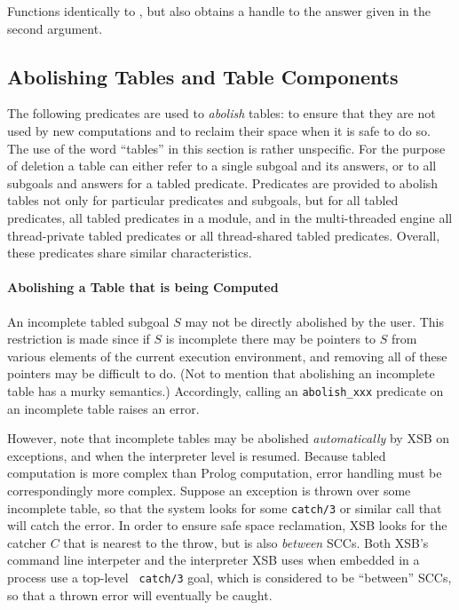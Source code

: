 \begin{description}
\begin{description}

%
Functions identically to , but also obtains a
handle to the answer given in the second argument.

\end{description}



\subsection{Abolishing Tables and Table Components}
\label{sec:TablePred:Deleting}

The following predicates are used to {\em abolish} tables: to ensure
that they are not used by new computations and to reclaim their space
when it is safe to do so.  The use of the word ``tables'' in this
section is rather unspecific.  For the purpose of deletion a table can
either refer to a single subgoal and its answers, or to all subgoals
and answers for a tabled predicate.  Predicates are provided to
abolish tables not only for particular predicates and subgoals, but
for all tabled predicates, all tabled predicates in a module, and in
the multi-threaded engine all thread-private tabled predicates or all
thread-shared tabled predicates.  Overall, these predicates share
similar characteristics.

\paragraph{Abolishing a Table that is being Computed}
An incomplete tabled subgoal $S$ may not be directly abolished by the
user.  This restriction is made since if $S$ is incomplete there may
be pointers to $S$ from various elements of the current execution
environment, and removing all of these pointers may be difficult to
do. (Not to mention that abolishing an incomplete table has a murky
semantics.)  Accordingly, calling an {\tt abolish\_xxx} predicate on
an incomplete table raises an error.  

However, note that incomplete tables may be abolished
\emph{automatically} by XSB on exceptions, and when the interpreter
level is resumed.  Because tabled computation is more complex than
Prolog computation, error handling must be correspondingly more
complex.  Suppose an exception is thrown over some incomplete table,
so that the system looks for some {\tt catch/3} or similar call that
will catch the error.  In order to ensure safe space reclamation, XSB
looks for the catcher $C$ that is nearest to the throw, but is also
{\em between} SCCs.  Both XSB's command line interpeter and the
interpreter XSB uses when embedded in a process use a top-level {\tt
  catch/3} goal, which is considered to be ``between'' SCCs, so that a
thrown error will eventually be caught.


\end{description}
